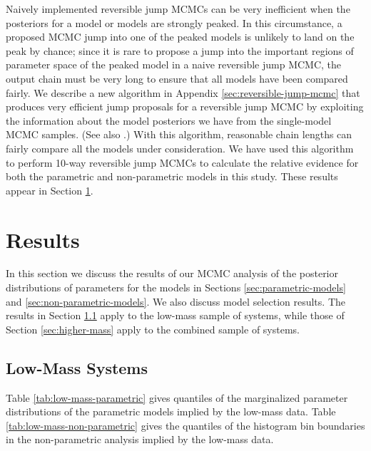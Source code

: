 \documentclass[preprint]{aastex}
\begin{document}
Naively implemented reversible jump MCMCs can be very inefficient when
the posteriors for a model or models are strongly peaked.  In this
circumstance, a proposed MCMC jump into one of the peaked models is
unlikely to land on the peak by chance; since it is rare to propose a
jump into the important regions of parameter space of the peaked model
in a naive reversible jump MCMC, the output chain must be very long to
ensure that all models have been compared fairly.  We describe a new
algorithm in Appendix \ref{sec:reversible-jump-mcmc} that produces
very efficient jump proposals for a reversible jump MCMC by exploiting
the information about the model posteriors we have from the
single-model MCMC samples.  (See also \citet{Farr2010}.)  With this
algorithm, reasonable chain lengths can fairly compare all the models
under consideration.  We have used this algorithm to perform 10-way
reversible jump MCMCs to calculate the relative evidence for both the
parametric and non-parametric models in this study.  These results
appear in Section \ref{sec:results}.

\section{Results}
\label{sec:results}

In this section we discuss the results of our MCMC analysis of the
posterior distributions of parameters for the models in Sections
\ref{sec:parametric-models} and \ref{sec:non-parametric-models}.  We
also discuss model selection results.  The results in Section
\ref{sec:results-low-mass} apply to the low-mass sample of
systems, while those of Section \ref{sec:higher-mass} apply to the
combined sample of systems.

\subsection{Low-Mass Systems}
\label{sec:results-low-mass}

Table \ref{tab:low-mass-parametric} gives quantiles of the
marginalized parameter distributions of the parametric models implied
by the low-mass data.  Table \ref{tab:low-mass-non-parametric} gives
the quantiles of the histogram bin boundaries in the non-parametric
analysis implied by the low-mass data.
\end{document}
